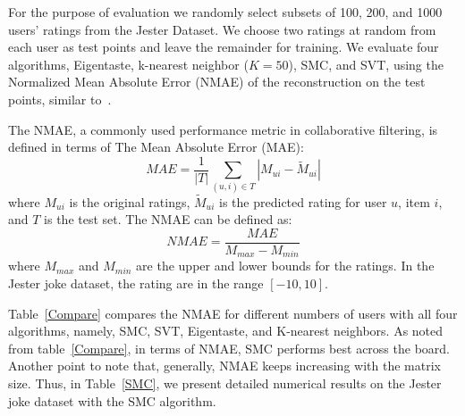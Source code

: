 \documentclass{article} %
\begin{document}
For the purpose of evaluation we randomly select subsets of 100, 200,
and 1000 users' ratings from the Jester Dataset. We choose two ratings
at random from each user as test points and leave the remainder for
training. We evaluate four algorithms, Eigentaste, k-nearest neighbor
($K = 50$), SMC, and SVT, using the Normalized Mean Absolute Error
(NMAE) of the reconstruction on the test points, similar
to~\cite{oh2010thesis}.

The NMAE, a commonly used performance metric in collaborative
filtering, is defined in terms of The Mean Absolute Error (MAE):
\begin{equation}
MAE = \frac{1}{|T|}\sum\limits_{(u,i) \in T} |M_{ui} - \widetilde{M}_{ui}|
\end{equation}
where $M_{ui}$ is the original ratings, $\widetilde{M}_{ui}$ is the
predicted rating for user $u$, item $i$, and $T$ is the test set. The
NMAE can be defined as:
\begin{equation}
NMAE = \frac{MAE}{M_{max}-M_{min}}
\end{equation}
where $M_{max}$ and $M_{min}$ are the upper and lower bounds for the
ratings. In the Jester joke dataset, the rating are in the range
$[-10,10]$.


Table~\ref{Compare} compares the NMAE for different numbers of users
with all four algorithms, namely, SMC, SVT, Eigentaste, and K-nearest
neighbors. As noted from table~\ref{Compare}, in terms of NMAE, SMC
performs best across the board. Another point to note that, generally,
NMAE keeps increasing with the matrix size. Thus, in Table~\ref{SMC},
we present detailed numerical results on the Jester joke dataset with
the SMC algorithm.
\end{document}
